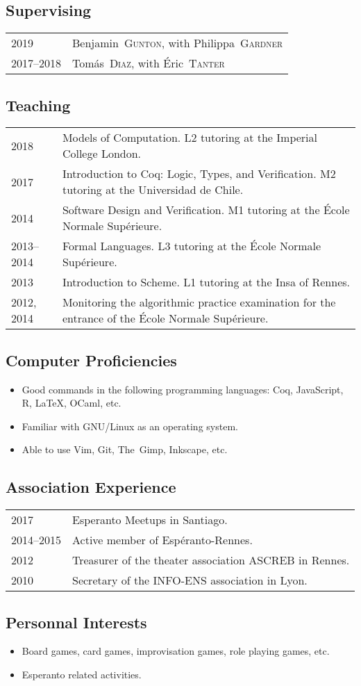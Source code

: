 \documentclass[12pt,a4paper]{article}
\makeatletter
\newcommand{\fr}[1]{\foreignlanguage{french}{{#1}}}
\newcommand{\es}[1]{\foreignlanguage{spanish}{{#1}}}
\newcommand{\fr}[1]{\foreignlanguage{francais}{{#1}}}
\newcommand{\es}[1]{\foreignlanguage{spanish}{{#1}}}
\newenvironment{datecvsection}[1]%
               {\subsection*{#1}%
                 \noindent \begin{tabular}{@{}p{\annee}p{\texte}@{}}}
               {\end{tabular}}
\newenvironment{itemcvsection}[1]%
               {\subsection*{#1}\begin{itemize}}
               {\end{itemize}}
\newcommand\familyName{\textsc}
\newcommand\placeName{}
\makeatother
\begin{document}
\begin{datecvsection}{Supervising}

    2019 & Benjamin~\familyName{Gunton}, with Philippa~\familyName{Gardner} \\
    2017–2018 & Tomás~\familyName{Diaz}, with Éric~\familyName{Tanter} \\

\end{datecvsection}

\begin{datecvsection}{Teaching}

    2018 & Models of Computation. L2 tutoring at the Imperial College London. \\

    2017 & Introduction to Coq: Logic, Types, and Verification. M2 tutoring at the \es{\placeName{Universidad de Chile}}. \\

    2014 & Software Design and Verification. M1 tutoring at the \fr{\placeName{École Normale Supérieure}}. \\

    2013–2014 & Formal Languages. L3 tutoring at the \fr{\placeName{École Normale Supérieure}}. \\

    2013 & Introduction to Scheme. L1 tutoring at the \placeName{Insa} of \placeName{Rennes}. \\

    2012, 2014 & Monitoring the algorithmic practice examination for the entrance of the \fr{\placeName{École Normale Supérieure}}. \\

\end{datecvsection}

\begin{itemcvsection}{Computer Proficiencies}

	\item Good commands in the following programming languages:  Coq, JavaScript, R, \LaTeX, OCaml, etc.
	\item Familiar with GNU/Linux as an operating system.
	\item Able to use Vim, Git, The~Gimp, Inkscape, etc.

\end{itemcvsection}

\begin{datecvsection}{Association Experience}

    2017 & Esperanto Meetups in \placeName{Santiago}. \\
    2014–2015 & Active member of {Espéranto-Rennes}. \\
	2012 & Treasurer of the theater association {ASCREB} in \placeName{Rennes}. \\
	2010 & Secretary of the \textsc{INFO-ENS} association in \placeName{Lyon}. \\

\end{datecvsection}

\begin{itemcvsection}{Personnal Interests}

	\item Board games, card games, improvisation games, role playing games, etc.
    \item Esperanto related activities.

\end{itemcvsection}
\end{document}
